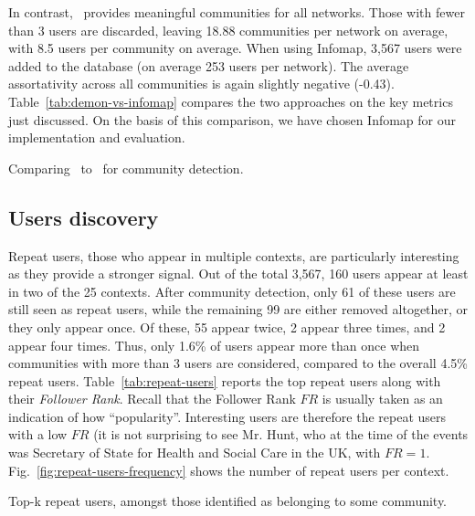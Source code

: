 In contrast, \infomap~provides meaningful communities for all networks.
Those with fewer than 3 users are discarded, leaving  18.88 communities per network on average, with 8.5 users per community on average.
When using Infomap, 3,567 users were added to the database (on average 253 users per network).
The average assortativity across all communities is again slightly negative (-0.43).
%
Table~\ref{tab:demon-vs-infomap} compares the two approaches on the key metrics just discussed. On the basis of this comparison, we have chosen Infomap for  our implementation and evaluation.

\begin{table}
	\resizebox{\textwidth}{!}{
	    
	}
	\caption{Comparing \demon~to \infomap~for community detection.}
	\label{tab:demon-vs-infomap}
\end{table}

\subsection{Users discovery}  \label{sec:users}

Repeat users, those who appear in multiple contexts, are particularly interesting as they provide a stronger signal. 
Out of the total 3,567, 160 users  appear at least in two of the 25 contexts.
After community detection, only 61 of these users are still seen as repeat users,
while the remaining 99 are either removed altogether, or they only appear once.
Of these, 55 appear twice, 2 appear three times, and 2 appear four times. 
Thus, only 1.6\% of users appear more than once when communities with more than 3 users are considered, compared to the overall 4.5\% repeat users.
%
Table~\ref{tab:repeat-users} reports the top repeat users along with their \textit{Follower Rank}.  
Recall that the Follower Rank $FR$ is usually taken as an indication of how ``popularity''. 
Interesting users are therefore the repeat users with a low $FR$  (it is not surprising to see Mr. Hunt, who at the time of the events was Secretary of State for Health and Social Care in the UK, with $FR =1.$
%
Fig.~\ref{fig:repeat-users-frequency} shows the number of repeat users per context. 

\begin{table}
	\centering
	
	\resizebox{\textwidth}{!}{
		
	}
	\caption{Top-k repeat users, amongst those identified as belonging to some community.}
	\label{tab:repeat-users}
\end{table}

